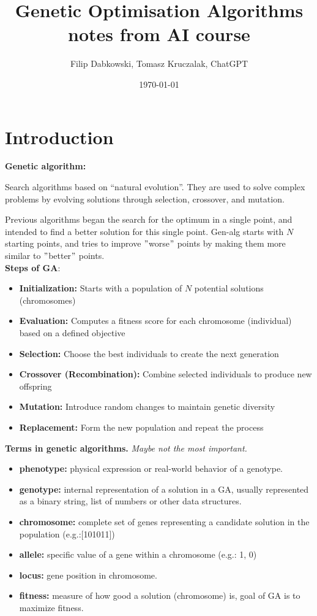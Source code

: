 \documentclass[11pt]{article}
\title{Genetic Optimisation Algorithms notes from AI course}
\author{Filip Dabkowski, Tomasz Kruczalak, ChatGPT}
\date{\today}
\begin{document}
    \maketitle

    \section[title]{Introduction}\label{sec:hello}

    \textbf{Genetic algorithm:}

    Search algorithms based on “natural evolution”.
    They are used to solve complex problems by evolving solutions through selection, crossover, and mutation.

    Previous algorithms began the search for the optimum in a single point, and intended to find a better solution for this single point.
    Gen-alg starts with $N$ starting points, and tries to improve \("\)worse\("\) points by making them more similar to \("\)better\("\) points.\\

    \textbf{Steps of GA}:
    \begin{itemize}
        \item \textbf{Initialization:} Starts with a population of $N$ potential solutions (chromosomes)
        \item \textbf{Evaluation:} Computes a fitness score for each chromosome (individual) based on a defined objective
        \item \textbf{Selection:} Choose the best individuals to create the next generation
        \item \textbf{Crossover (Recombination):} Combine selected individuals to produce new offspring
        \item \textbf{Mutation:} Introduce random changes to maintain genetic diversity
        \item \textbf{Replacement:} Form the new population and repeat the process\\
    \end{itemize}

    \textbf{Terms in genetic algorithms.} \textit{Maybe not the most important.}
    \begin{itemize}
        \item \textbf{phenotype:} physical expression or real-world behavior of a genotype.
        \item \textbf{genotype:} internal representation of a solution in a GA, usually represented as a binary string, list of numbers or other data structures.
        \item \textbf{chromosome:} complete set of genes representing a candidate solution in the population (e.g.:[101011])
        \item \textbf{allele:} specific value of a gene within a chromosome (e.g.: 1, 0)
        \item \textbf{locus:} gene position in chromosome.
        \item \textbf{fitness:} measure of how good a solution (chromosome) is, goal of GA is to maximize fitness.\\
    \end{itemize}
\end{document}
